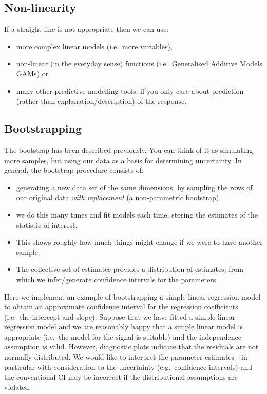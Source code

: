 \documentclass[
  oneside]{krantz}
\providecommand{\tightlist}{%
  \setlength{\itemsep}{0pt}\setlength{\parskip}{0pt}}
\begin{document}
\hypertarget{non-linearity}{%
\subsection{Non-linearity}\label{non-linearity}}

If a straight line is not appropriate then we can use:

\begin{itemize}
\tightlist
\item
  more complex linear models (i.e.~more variables),
\item
  non-linear (in the everyday sense) functions (i.e.~Generalised Additive Models GAMs) or
\item
  many other predictive modelling tools, if you only care about prediction (rather than explanation/description) of the response.
\end{itemize}

\hypertarget{bootstrapping}{%
\subsection{Bootstrapping}\label{bootstrapping}}

The bootstrap has been described previously. You can think of it as simulating more samples, but using our data as a basis for determining uncertainty. In general, the bootstrap procedure consists of:

\begin{itemize}
\tightlist
\item
  generating a new data set of the same dimensions, by sampling the rows of our original data \emph{with replacement} (a non-parametric bootstrap),
\item
  we do this many times and fit models each time, storing the estimates of the statistic of interest.
\item
  This shows roughly how much things might change if we were to have another sample.
\item
  The collective set of estimates provides a distribution of estimates, from which we infer/generate confidence intervals for the parameters.
\end{itemize}

Here we implement an example of bootstrapping a simple linear regression model to obtain an approximate confidence interval for the regression coefficients (i.e.~the intercept and slope). Suppose that we have fitted a simple linear regression model and we are reasonably happy that a simple linear model is appropriate (i.e.~the model for the signal is suitable) and the independence assumption is valid. However, diagnostic plots indicate that the residuals are not normally distributed. We would like to interpret the parameter estimates - in particular with consideration to the uncertainty (e.g.~confidence intervals) and the conventional CI may be incorrect if the distributional assumptions are violated.
\end{document}
